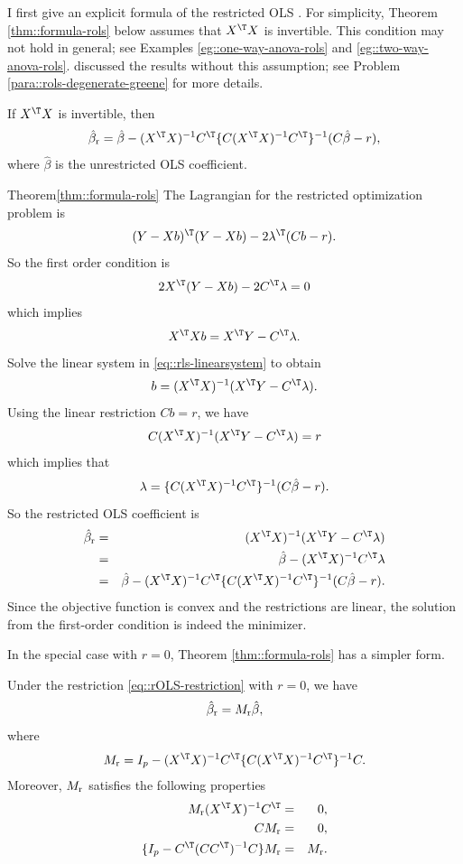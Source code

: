 I first give an explicit formula of the restricted OLS \citep{theil, rao}. For simplicity, Theorem \ref{thm::formula-rols} below assumes that $ X^{\T} X$ is invertible. This condition may not hold in general; see Examples \ref{eg::one-way-anova-rols} and \ref{eg::two-way-anova-rols}. \citet{greene} discussed the results without this assumption; see Problem \ref{para::rols-degenerate-greene} for more details.  

\begin{theorem}
\label{thm::formula-rols}
If $ X^{\T} X$ is invertible, then
$$
\hat{\beta}_\textup{r} = \hat{\beta} - (X^{\T} X)^{-1} C ^{\T} \{  C  (X^{\T} X)^{-1} C ^{\T} \}^{-1} (C  \hat{\beta} - r), 
$$
where $\hat{\beta}  $ is the unrestricted OLS coefficient. 
\end{theorem}


\begin{myproof}{Theorem}{\ref{thm::formula-rols}}
The Lagrangian for the restricted optimization problem is
$$
(Y - Xb)^{\T} (Y - Xb) - 2\lambda^{\T} (C b - r).
$$
So the first order condition is
$$
2X^{\T} (Y - Xb) - 2 C^{\T} \lambda = 0 
$$
which implies
\begin{equation}\label{eq::rls-linearsystem}
X^{\T}  X b = X^{\T} Y  -  C^{\T} \lambda .
\end{equation}
Solve the linear system in \eqref{eq::rls-linearsystem} to obtain
$$
b = (X^{\T}  X)^{-1}  (X^{\T} Y  -  C^{\T} \lambda).
$$
Using the linear restriction $C b = r$, we have
$$
C (X^{\T}  X)^{-1}  (X^{\T} Y  -  C^{\T} \lambda) = r
$$
which implies that
$$
\lambda =  
\{  C(X^{\T} X)^{-1} C^{\T} \}^{-1} (C  \hat{\beta} - r ).
$$
So the restricted OLS coefficient is
\begin{eqnarray*}
\hat{\beta}_\textup{r} 
&=& (X^{\T}  X)^{-1}  (X^{\T} Y  -  C^{\T} \lambda)  \\
&=&   \hat{\beta}  -  (X^{\T}  X)^{-1} C^{\T} \lambda  \\
&=&\hat{\beta} - (X^{\T} X)^{-1} C ^{\T} \{  C  (X^{\T} X)^{-1} C ^{\T} \}^{-1} (C  \hat{\beta} - r).
\end{eqnarray*}
Since the objective function is convex and the restrictions are linear, the solution from the first-order condition is indeed the minimizer. 
\end{myproof}
 
 
 
In the special case with $r=0$, Theorem \ref{thm::formula-rols} has a simpler form.

 \begin{corollary}
 \label{corollary::formula-rols-homo}
 Under the restriction \eqref{eq::rOLS-restriction} with $r=0$, we have 
 $$
\hat{\beta}_\textup{r}  =  M_\textup{r}  \hat{\beta} ,
 $$
 where 
  $$
 M_\textup{r} = I_p - (X^{\T} X)^{-1}  C ^{\T} \{  C  (X^{\T} X)^{-1} C ^{\T} \}^{-1}  C .
 $$ 
 Moreover, $ M_\textup{r} $ satisfies the following properties
\begin{eqnarray*}
 M_\textup{r}  (X^{\T} X)^{-1}  C ^{\T} &=& 0,
 \\ 
 C  M_\textup{r}  &=& 0,
 \\ 
 \{ I_p -  C^{\T} (C C^{\T})^{-1} C \}  M_\textup{r} &=&  M_\textup{r} .
\end{eqnarray*}
 \end{corollary}

